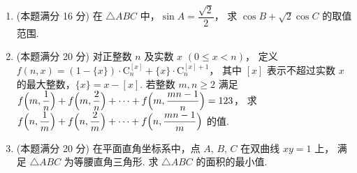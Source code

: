 \documentclass{chsmc}
\begin{document}
\begin{enumerate}[resume]
  \item (本题满分 16 分) 在 $\triangle ABC$ 中，$\sin A = \dfrac{\sqrt{2}}{2}$，
    求 $\cos B + \sqrt{2}\cos C$ 的取值范围.
  \item (本题满分 20 分) 对正整数 $n$ 及实数 $x$ $(0 \leqslant x < n)$，
    定义 $f(n,x) = (1 - \{x\})\cdot\mathrm{C}_n^{[x]} + \{x\}\cdot\mathrm{C}_n^{[x]+1}$，
    其中 $[x]$ 表示不超过实数 $x$ 的最大整数，$\{x\} = x - [x]$.
    若整数 $m, n \geqslant 2$ 满足
    $f\Bigl(m, \dfrac{1}{n}\Bigr) + f\Bigl(m, \dfrac{2}{n}\Bigr)
    + \cdots + f\Bigl(m, \dfrac{mn-1}{n}\Bigr) = 123$，
    求 $f\Bigl(n, \dfrac{1}{m}\Bigr) + f\Bigl(n, \dfrac{2}{m}\Bigr)
    + \cdots + f\Bigl(n, \dfrac{mn-1}{m}\Bigr)$ 的值.
  \item (本题满分 20 分) 在平面直角坐标系中，点 $A$, $B$, $C$ 在双曲线 $xy = 1$ 上，
    满足 $\triangle ABC$ 为等腰直角三角形. 求 $\triangle ABC$ 的面积的最小值.
\end{enumerate}
\end{document}
